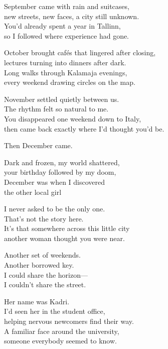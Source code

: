 \begin{lyrics}

September came with rain and suitcases,\\
new streets, new faces, a city still unknown.\\
You'd already spent a year in Tallinn,\\
so I followed where experience had gone.

October brought cafés that lingered after closing,\\
lectures turning into dinners after dark.\\
Long walks through Kalamaja evenings,\\
every weekend drawing circles on the map.

November settled quietly between us.\\
The rhythm felt so natural to me.\\
You disappeared one weekend down to Italy,\\
then came back exactly where I'd thought you'd be.

Then December came.


Dark and frozen, my world shattered,\\
your birthday followed by my doom,\\
December was when I discovered\\
the other local girl


I never asked to be the only one.\\
That's not the story here.\\
It's that somewhere across this little city\\
another woman thought you were near.

Another set of weekends.\\
Another borrowed key.\\
I could share the horizon—\\
I couldn't share the street.


Her name was Kadri.\\
I'd seen her in the student office,\\
helping nervous newcomers find their way.\\
A familiar face around the university,\\
someone everybody seemed to know.


\end{lyrics}
